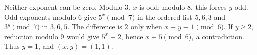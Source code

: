 Neither exponent can be zero. Modulo $3$, $x$ is odd; modulo $8$, this forces $y$ odd. Odd exponents modulo $6$ give $5^x\pmod7$ in the ordered list $5,6,3$ and $3^y\pmod7$ in $3,6,5$. The difference is $2$ only when $x\equiv y\equiv1\pmod6$. If $y\ge2$, reduction modulo $9$ would give $5^x\equiv2$, hence $x\equiv5\pmod6$, a contradiction. Thus $y=1$, and $\boxed{(x,y)=(1,1)}$.
